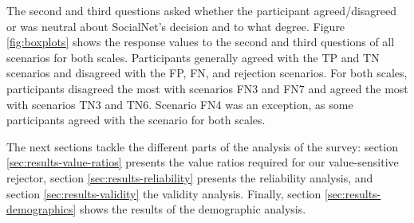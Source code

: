 %
The second and third questions asked whether the participant agreed/disagreed or was neutral about SocialNet's decision and to what degree.
%
Figure \ref{fig:boxplots} shows the response values to the second and third questions of all scenarios for both scales.
%
Participants generally agreed with the TP and TN scenarios and disagreed with the FP, FN, and rejection scenarios.
%
For both scales, participants disagreed the most with scenarios FN3 and FN7 and agreed the most with scenarios TN3 and TN6.
%
Scenario FN4 was an exception, as some participants agreed with the scenario for both scales.
%

%
The next sections tackle the different parts of the analysis of the survey: section \ref{sec:results-value-ratios} presents the value ratios required for our value-sensitive rejector, section \ref{sec:results-reliability} presents the reliability analysis, and section \ref{sec:results-validity} the validity analysis.
%
Finally, section \ref{sec:results-demographics} shows the results of the demographic analysis.
%

